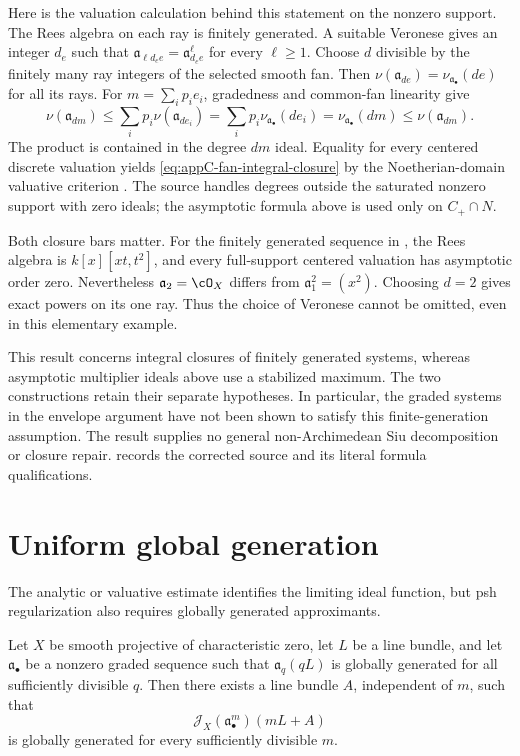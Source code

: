 Here is the valuation calculation behind this statement on the nonzero
support. The Rees algebra on each ray is finitely generated. A suitable
Veronese gives an integer $d_e$ such that
$\mathfrak a_{\ell d_e e}=\mathfrak a_{d_e e}^{\ell}$ for every
$\ell\geq1$. Choose $d$ divisible by the finitely many ray integers
of the selected smooth fan. Then
$\nu(\mathfrak a_{de})=\nu_{\mathfrak a_\bullet}(de)$ for all its rays.
For $m=\sum_i p_i e_i$, gradedness and common-fan linearity give
\[\tag{C.18e}\label{eq:appC-fan-valuation-chain}
 \nu(\mathfrak a_{dm})
 \leq\sum_i p_i\nu(\mathfrak a_{de_i})
 =\sum_i p_i\nu_{\mathfrak a_\bullet}(de_i)
 =\nu_{\mathfrak a_\bullet}(dm)
 \leq\nu(\mathfrak a_{dm}).
\]
The product is contained in the degree $dm$ ideal. Equality for every
centered discrete valuation yields
\eqref{eq:appC-fan-integral-closure} by the Noetherian-domain valuative
criterion \cite[Proposition~6.8.2]{SwansonHuneke2006}.
The source handles degrees outside the saturated nonzero support with
zero ideals; the asymptotic formula above is used only on $C_+\cap N$.

Both closure bars matter. For the finitely generated sequence in
, the Rees algebra is
$k[x][xt,t^2]$, and every full-support centered valuation has
asymptotic order zero. Nevertheless
$\mathfrak a_2=\cO_X$ differs from $\mathfrak a_1^2=(x^2)$.
Choosing $d=2$ gives exact powers on its one ray. Thus the choice of
Veronese cannot be omitted, even in this elementary example.

This result concerns integral closures of finitely generated systems,
whereas asymptotic multiplier ideals above use a stabilized maximum.
The two constructions retain their separate hypotheses. In particular,
the graded systems in the envelope argument have not been shown to
satisfy this finite-generation assumption. The result supplies no
general non-Archimedean Siu decomposition or closure repair.
 records the corrected source and its
literal formula qualifications.

\section{Uniform global generation}
\label{sec:appC-global-generation}

The analytic or valuative estimate identifies the limiting ideal function,
but psh regularization also requires globally generated approximants.

\begin{theorem}\label{thm:appC-uniform-generation-multiplier}
Let \(X\) be smooth projective of characteristic zero, let \(L\) be a line
bundle, and let \(\mathfrak a_\bullet\) be a nonzero graded sequence such that
\(\mathfrak a_q(qL)\) is globally generated for all sufficiently divisible
\(q\).  Then there exists a line bundle \(A\), independent of \(m\), such
that
\[
 \mathcal J_X(\mathfrak a_\bullet^m)(mL+A)
\tag{C.19}\label{eq:appC-uniform-generation-multiplier}
\]
is globally generated for every sufficiently divisible \(m\).
\end{theorem}

